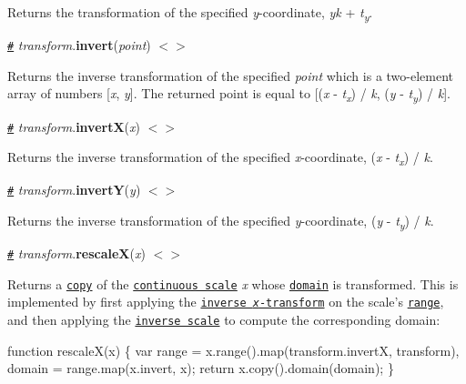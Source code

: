 Returns the transformation of the specified {\itshape y}-\/coordinate, {\itshape yk} + {\itshape t\textsubscript{y}}.

\href{#transform_invert}{\tt \#} {\itshape transform}.{\bfseries invert}({\itshape point}) \href{https://github.com/d3/d3-zoom/blob/master/src/transform.js#L24}{\tt $<$$>$}

Returns the inverse transformation of the specified {\itshape point} which is a two-\/element array of numbers \mbox{[}{\itshape x}, {\itshape y}\mbox{]}. The returned point is equal to \mbox{[}({\itshape x} -\/ {\itshape t\textsubscript{x}}) / {\itshape k}, ({\itshape y} -\/ {\itshape t\textsubscript{y}}) / {\itshape k}\mbox{]}.

\href{#transform_invertX}{\tt \#} {\itshape transform}.{\bfseries invertX}({\itshape x}) \href{https://github.com/d3/d3-zoom/blob/master/src/transform.js#L27}{\tt $<$$>$}

Returns the inverse transformation of the specified {\itshape x}-\/coordinate, ({\itshape x} -\/ {\itshape t\textsubscript{x}}) / {\itshape k}.

\href{#transform_invertY}{\tt \#} {\itshape transform}.{\bfseries invertY}({\itshape y}) \href{https://github.com/d3/d3-zoom/blob/master/src/transform.js#L30}{\tt $<$$>$}

Returns the inverse transformation of the specified {\itshape y}-\/coordinate, ({\itshape y} -\/ {\itshape t\textsubscript{y}}) / {\itshape k}.

\href{#transform_rescaleX}{\tt \#} {\itshape transform}.{\bfseries rescaleX}({\itshape x}) \href{https://github.com/d3/d3-zoom/blob/master/src/transform.js#L33}{\tt $<$$>$}

Returns a \href{https://github.com/d3/d3-scale#continuous_copy}{\tt copy} of the \href{https://github.com/d3/d3-scale#continuous-scales}{\tt continuous scale} {\itshape x} whose \href{https://github.com/d3/d3-scale#continuous_domain}{\tt domain} is transformed. This is implemented by first applying the \href{#transform_invertX}{\tt inverse {\itshape x}-\/transform} on the scale’s \href{https://github.com/d3/d3-scale#continuous_range}{\tt range}, and then applying the \href{https://github.com/d3/d3-scale#continuous_invert}{\tt inverse scale} to compute the corresponding domain\+:


\begin{DoxyCode}
function rescaleX(x) \{
  var range = x.range().map(transform.invertX, transform),
      domain = range.map(x.invert, x);
  return x.copy().domain(domain);
\}
\end{DoxyCode}


